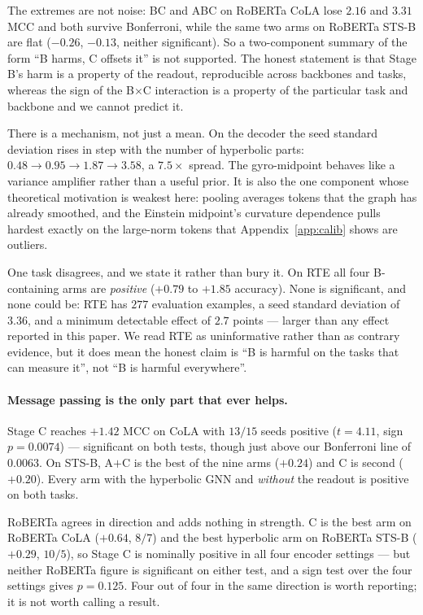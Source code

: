 \documentclass{article}
\begin{document}
The extremes are not noise: BC and ABC on RoBERTa CoLA lose $2.16$ and $3.31$
MCC and both survive Bonferroni, while the same two arms on RoBERTa STS-B are
flat ($-0.26$, $-0.13$, neither significant). So a two-component summary of the
form ``B harms, C offsets it'' is not supported. The honest statement is that
Stage B's harm is a property of the readout, reproducible across backbones and
tasks, whereas the sign of the B$\times$C interaction is a property of the
particular task and backbone and we cannot predict it.

There is a mechanism, not just a mean. On the decoder the seed standard
deviation rises in step with the number of hyperbolic parts:
$0.48 \rightarrow 0.95 \rightarrow 1.87 \rightarrow 3.58$, a $7.5\times$
spread. The gyro-midpoint behaves like a variance amplifier rather than a useful
prior. It is also the one component whose theoretical motivation is weakest
here: pooling averages tokens that the graph has already smoothed, and the
Einstein midpoint's curvature dependence pulls hardest exactly on the
large-norm tokens that Appendix~\ref{app:calib} shows are outliers.

One task disagrees, and we state it rather than bury it. On RTE all four
B-containing arms are \emph{positive} ($+0.79$ to $+1.85$ accuracy). None is
significant, and none could be: RTE has $277$ evaluation examples, a seed
standard deviation of $3.36$, and a minimum detectable effect of $2.7$ points
--- larger than any effect reported in this paper. We read RTE as uninformative
rather than as contrary evidence, but it does mean the honest claim is ``B is
harmful on the tasks that can measure it'', not ``B is harmful
everywhere''.

\paragraph{Message passing is the only part that ever helps.} Stage C reaches
$+1.42$ MCC on CoLA with $13/15$ seeds positive ($t = 4.11$, sign $p = 0.0074$)
--- significant on both tests, though just above our Bonferroni line of
$0.0063$. On STS-B, A${+}$C is the best of the nine arms ($+0.24$) and C is
second ($+0.20$). Every arm with the hyperbolic GNN and \emph{without} the
readout is positive on both tasks.

RoBERTa agrees in direction and adds nothing in strength. C is the best arm on
RoBERTa CoLA ($+0.64$, $8/7$) and the best hyperbolic arm on RoBERTa STS-B
($+0.29$, $10/5$), so Stage C is nominally positive in all four encoder
settings --- but neither RoBERTa figure is significant on either test, and a
sign test over the four settings gives $p=0.125$. Four out of four in the same
direction is worth reporting; it is not worth calling a result.
\end{document}
